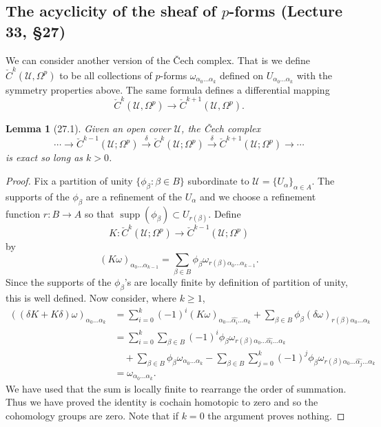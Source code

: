 \documentclass[UTF8,11pt,a4paper]{ctexart}
\newtheorem*{lemma}{Lemma}
\theoremstyle{definition}\newtheorem*{definition}{Definition}
\theoremstyle{remark}\newtheorem*{remark}{Remark}
\begin{document}
\subsection*{The acyclicity of the sheaf of $p$-forms (Lecture 33, \S27)}
We can consider another version of the \v Cech complex. That is we define $\check C^k(\mathcal U,\Omega^p)$ to be all collections of $p$-forms $\omega_{\alpha_0\ldots\alpha_k}$ defined on $U_{\alpha_0\ldots\alpha_k}$ with the symmetry properties above. The same formula defines a differential mapping
\[
\check C^k(\mathcal U,\Omega^p)\longrightarrow\check C^{k+1}(\mathcal U,\Omega^p).
\]
\begin{lemma}[27.1]
Given an open cover $\mathcal U$, the \v Cech complex
\[
\cdots\longrightarrow\check C^{k-1}(\mathcal U;\Omega^p)
\xrightarrow{\delta}\check C^k(\mathcal U;\Omega^p)
\xrightarrow{\delta}\check C^{k+1}(\mathcal U;\Omega^p)\longrightarrow\cdots
\]
is exact so long as $k>0$.
\end{lemma}
\begin{proof}
Fix a partition of unity $\{\phi_\beta:\beta\in B\}$ subordinate to $\mathcal U=\{U_\alpha\}_{\alpha\in A}$. The supports of the $\phi_\beta$ are a refinement of the $U_\alpha$ and we choose a refinement function $r:B\to A$ so that $\operatorname{supp}(\phi_\beta)\subset U_{r(\beta)}$. Define
\[
K:\check C^k(\mathcal U;\Omega^p)\longrightarrow\check C^{k-1}(\mathcal U;\Omega^p)
\]
by
\[
(K\omega)_{\alpha_0\ldots\alpha_{k-1}}
=\sum_{\beta\in B}\phi_\beta\omega_{r(\beta)\alpha_0\ldots\alpha_{k-1}}.
\]
Since the supports of the $\phi_\beta$'s are locally finite by definition of partition of unity, this is well defined. Now consider, where $k\ge1$,
\begin{align*}
((\delta K+K\delta)\omega)_{\alpha_0\ldots\alpha_k}
&=\sum_{i=0}^k(-1)^i(K\omega)_{\alpha_0\ldots\widehat{\alpha_i}\ldots\alpha_k}
 +\sum_{\beta\in B}\phi_\beta(\delta\omega)_{r(\beta)\alpha_0\ldots\alpha_k}\\
&=\sum_{i=0}^k\sum_{\beta\in B}(-1)^i\phi_\beta
\omega_{r(\beta)\alpha_0\ldots\widehat{\alpha_i}\ldots\alpha_k}\\
&\quad+\sum_{\beta\in B}\phi_\beta\omega_{\alpha_0\ldots\alpha_k}
-\sum_{\beta\in B}\sum_{j=0}^k(-1)^j\phi_\beta
\omega_{r(\beta)\alpha_0\ldots\widehat{\alpha_j}\ldots\alpha_k}\\
&=\omega_{\alpha_0\ldots\alpha_k}.
\end{align*}
We have used that the sum is locally finite to rearrange the order of summation. Thus we have proved the identity is cochain homotopic to zero and so the cohomology groups are zero. Note that if $k=0$ the argument proves nothing.
\end{proof}
\end{document}
